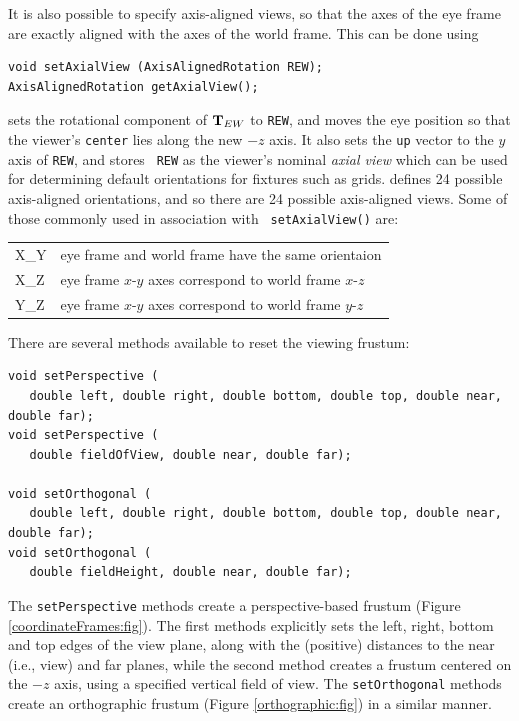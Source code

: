 It is also possible to specify axis-aligned views, so that the axes of
the eye frame are exactly aligned with the axes of the world
frame. This can be done using
%
\begin{lstlisting}[]
void setAxialView (AxisAlignedRotation REW);
AxisAlignedRotation getAxialView();
\end{lstlisting}
%
 sets the rotational
component of ${\bf T}_{EW}$ to {\tt REW}, and moves the eye position so
that the viewer's {\tt center} lies along the new $-z$ axis. It also
sets the {\tt up} vector to the $y$ axis of {\tt REW}, and stores {\tt
REW} as the viewer's nominal {\it axial view} which can be used for
determining default orientations for fixtures such as grids.
 defines 24 possible
axis-aligned orientations, and so there are 24 possible axis-aligned
views. Some of those commonly used in association with {\tt
setAxialView()} are:

\begin{center}
\begin{tabular}{|l|l|}
\hline 
X\_Y & eye frame and world frame have the same orientaion\\
X\_Z & eye frame $x$-$y$ axes correspond to world frame $x$-$z$\\
Y\_Z & eye frame $x$-$y$ axes correspond to world frame $y$-$z$\\
\hline
\end{tabular}
\end{center}

There are several methods available to reset the viewing frustum:
%
\begin{lstlisting}[]
void setPerspective (
   double left, double right, double bottom, double top, double near, double far);
void setPerspective (
   double fieldOfView, double near, double far);

void setOrthogonal (
   double left, double right, double bottom, double top, double near, double far);
void setOrthogonal (
   double fieldHeight, double near, double far);
\end{lstlisting}
%
The {\tt setPerspective} methods create a perspective-based frustum
(Figure \ref{coordinateFrames:fig}). The first methods explicitly sets
the left, right, bottom and top edges of the view plane, along with
the (positive) distances to the near (i.e., view) and far planes,
while the second method creates a frustum centered on the $-z$ axis,
using a specified vertical field of view. The {\tt setOrthogonal}
methods create an orthographic frustum (Figure \ref{orthographic:fig})
in a similar manner.

